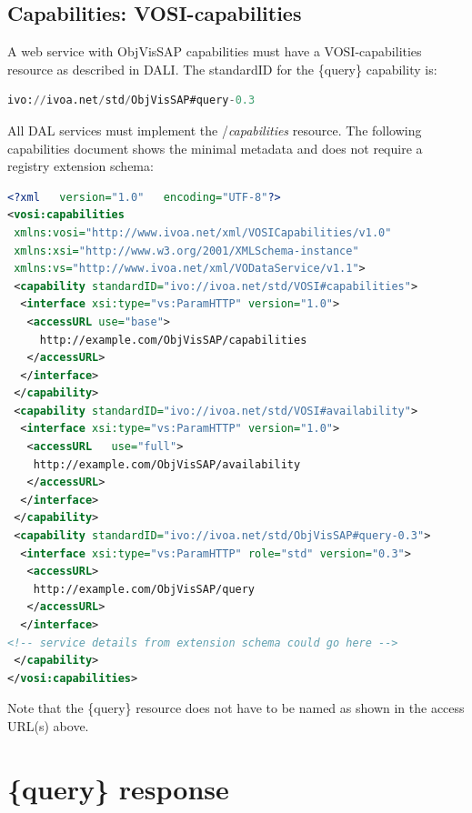 \documentclass[11pt,a4paper]{ivoa}
\begin{document}
\subsection{Capabilities: VOSI-capabilities}
A web service with ObjVisSAP capabilities must have a VOSI-capabilities
resource as described in DALI. The standardID for the \{query\}
capability is:

\begin{lstlisting}[language=SQL]
ivo://ivoa.net/std/ObjVisSAP#query-0.3
\end{lstlisting}
All DAL services must implement the /\textit{capabilities} resource.
The following capabilities document shows the minimal metadata and does
not require a registry extension schema:

\begin{lstlisting}[language=XML]
<?xml	version="1.0"	encoding="UTF-8"?>
<vosi:capabilities
 xmlns:vosi="http://www.ivoa.net/xml/VOSICapabilities/v1.0"
 xmlns:xsi="http://www.w3.org/2001/XMLSchema-instance"
 xmlns:vs="http://www.ivoa.net/xml/VODataService/v1.1">
 <capability standardID="ivo://ivoa.net/std/VOSI#capabilities">
  <interface xsi:type="vs:ParamHTTP" version="1.0">
   <accessURL use="base">
     http://example.com/ObjVisSAP/capabilities
   </accessURL>
  </interface>
 </capability>
 <capability standardID="ivo://ivoa.net/std/VOSI#availability">
  <interface xsi:type="vs:ParamHTTP" version="1.0">
   <accessURL	use="full">
    http://example.com/ObjVisSAP/availability
   </accessURL>
  </interface>
 </capability>
 <capability standardID="ivo://ivoa.net/std/ObjVisSAP#query-0.3">
  <interface xsi:type="vs:ParamHTTP" role="std"	version="0.3">
   <accessURL>
    http://example.com/ObjVisSAP/query
   </accessURL>
  </interface>
<!-- service details from extension schema could go here -->
 </capability>
</vosi:capabilities>

\end{lstlisting}

Note that the \{query\} resource does not have to be named as shown in
the access URL(s) above.

\section{\{query\} response}
\end{document}
